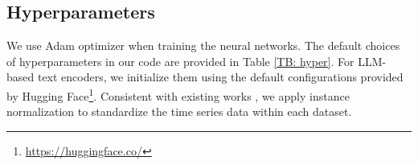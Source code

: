 \begin{table*}[t]
\centering
\caption{Overview of the numerical data in the experimental datasets \cite{DBLP:journals/corr/abs-2406-08627}. Our experiments utilize 9 datasets spanning multiple domains. ``Prediction Length" refers to the number of future time points to be forecasted, with each dataset including four distinct prediction settings. refers to the number of variables (or variates) in each dataset.}
\label{tab: dataset details}
\vspace{3mm}
\end{table*}




\subsection{Hyperparameters}
We use Adam optimizer \cite{DBLP:journals/corr/KingmaB14} when training the neural networks. The default choices of hyperparameters in our code are provided in Table \ref{TB: hyper}. For LLM-based text encoders, we initialize them using the default configurations provided by Hugging Face\footnote{\url{https://huggingface.co/}}. Consistent with existing works \cite{DBLP:conf/iclr/WuHLZ0L23, itransformer}, we apply instance normalization to standardize the time series data within each dataset.

